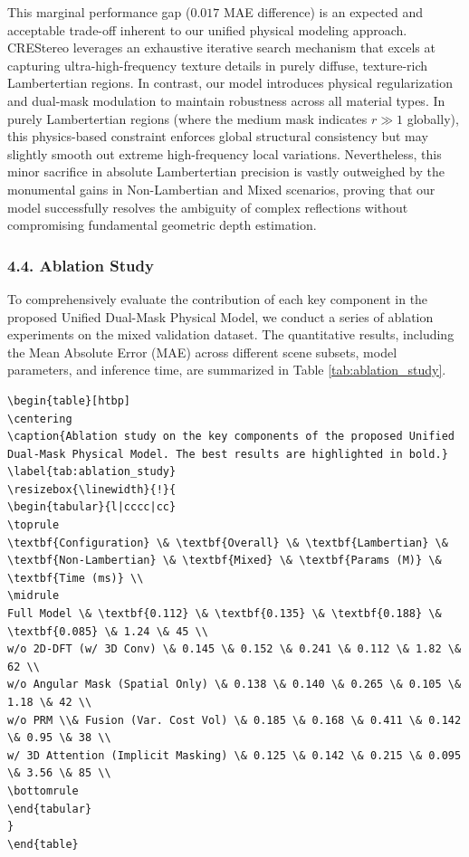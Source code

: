 This marginal performance gap ($0.017$ MAE difference) is an expected and acceptable trade-off inherent to our unified physical modeling approach. CREStereo leverages an exhaustive iterative search mechanism that excels at capturing ultra-high-frequency texture details in purely diffuse, texture-rich Lambertertian regions. In contrast, our model introduces physical regularization and dual-mask modulation to maintain robustness across all material types. In purely Lambertertian regions (where the medium mask indicates $r \gg 1$ globally), this physics-based constraint enforces global structural consistency but may slightly smooth out extreme high-frequency local variations. Nevertheless, this minor sacrifice in absolute Lambertertian precision is vastly outweighed by the monumental gains in Non-Lambertian and Mixed scenarios, proving that our model successfully resolves the ambiguity of complex reflections without compromising fundamental geometric depth estimation.

\subsubsection{4.4. Ablation Study}

To comprehensively evaluate the contribution of each key component in the proposed Unified Dual-Mask Physical Model, we conduct a series of ablation experiments on the mixed validation dataset. The quantitative results, including the Mean Absolute Error (MAE) across different scene subsets, model parameters, and inference time, are summarized in Table \ref{tab:ablation_study}.

\begin{verbatim}
\begin{table}[htbp]
\centering
\caption{Ablation study on the key components of the proposed Unified Dual-Mask Physical Model. The best results are highlighted in bold.}
\label{tab:ablation_study}
\resizebox{\linewidth}{!}{
\begin{tabular}{l|cccc|cc}
\toprule
\textbf{Configuration} \& \textbf{Overall} \& \textbf{Lambertian} \& \textbf{Non-Lambertian} \& \textbf{Mixed} \& \textbf{Params (M)} \& \textbf{Time (ms)} \\
\midrule
Full Model \& \textbf{0.112} \& \textbf{0.135} \& \textbf{0.188} \& \textbf{0.085} \& 1.24 \& 45 \\
w/o 2D-DFT (w/ 3D Conv) \& 0.145 \& 0.152 \& 0.241 \& 0.112 \& 1.82 \& 62 \\
w/o Angular Mask (Spatial Only) \& 0.138 \& 0.140 \& 0.265 \& 0.105 \& 1.18 \& 42 \\
w/o PRM \\& Fusion (Var. Cost Vol) \& 0.185 \& 0.168 \& 0.411 \& 0.142 \& 0.95 \& 38 \\
w/ 3D Attention (Implicit Masking) \& 0.125 \& 0.142 \& 0.215 \& 0.095 \& 3.56 \& 85 \\
\bottomrule
\end{tabular}
}
\end{table}

\end{verbatim}

